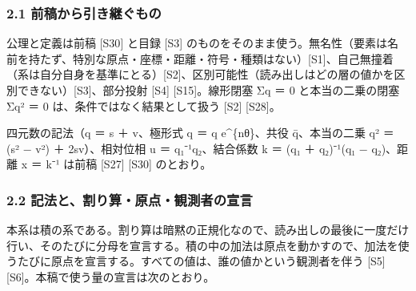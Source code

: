 \documentclass[
  a4paper,
]{ltjsarticle}
\begin{document}
\subsubsection{2.1
前稿から引き継ぐもの}\label{ux524dux7a3fux304bux3089ux5f15ux304dux7d99ux3050ux3082ux306e}

公理と定義は前稿 {[}S30{]} と目録 {[}S3{]}
のものをそのまま使う。無名性（要素は名前を持たず、特別な原点・座標・距離・符号・種類はない）{[}S1{]}、自己無撞着（系は自分自身を基準にとる）{[}S2{]}、区別可能性（読み出しはどの層の値かを区別できない）{[}S3{]}、部分投射
{[}S4{]} {[}S15{]}。線形閉塞 Σq ＝ 0 と本当の二乗の閉塞 Σq² ＝ 0
は、条件ではなく結果として扱う {[}S2{]} {[}S28{]}。

四元数の記法（q ＝ s ＋ v、極形式 q ＝ \textbar q\textbar{}
e\^{}\{nθ\}、共役 q̄、本当の二乗 q² ＝ (s² − \textbar v\textbar²) ＋
2sv）、相対位相 u ＝ q₁⁻¹q₂、結合係数 k ＝ (q₁ ＋ q₂)⁻¹(q₁ − q₂)、距離 x
＝ k⁻¹ は前稿 {[}S27{]} {[}S30{]} のとおり。

\subsubsection{2.2
記法と、割り算・原点・観測者の宣言}\label{ux8a18ux6cd5ux3068ux5272ux308aux7b97ux539fux70b9ux89b3ux6e2cux8005ux306eux5ba3ux8a00}

本系は積の系である。割り算は暗黙の正規化なので、読み出しの最後に一度だけ行い、そのたびに分母を宣言する。積の中の加法は原点を動かすので、加法を使うたびに原点を宣言する。すべての値は、誰の値かという観測者を伴う
{[}S5{]} {[}S6{]}。本稿で使う量の宣言は次のとおり。
\end{document}
